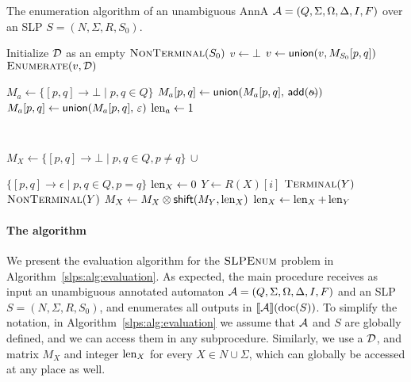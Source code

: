 \begin{algorithm*}[t]
	\caption{The enumeration algorithm of an unambiguous AnnA $\mathcal{A} = (Q,\Sigma, \Omega, \Delta,I,F)$ over an SLP $S = (N, \Sigma, R, S_0)$.}\label{slps:alg:evaluation}
	\smallskip
	\begin{varwidth}[t]{0.50\textwidth}
		\begin{algorithmic}[1]
			\State Initialize $\mathcal{D}$ as an empty \dsabbr
			\State $\textproc{NonTerminal}(S_0)$
			\State $v \gets \bot$
			\State $v \gets \mathsf{union}(v, M_{S_0}[p, q])$
			\EndFor
			\State $\textproc{Enumerate}(v, \cD)$
			
			\EndProcedure
			\smallskip
			
			\State $M_a \gets \{[p,q] \to \bot \mid p,q \in  Q\}$
			\State $M_a[p,q] \gets \union(M_a[p,q],\, \add(\oout))$
			\EndFor
			\State $M_a[p,q] \gets \mathsf{union}(M_a[p,q], \, \varepsilon)$
			\EndFor
			\State $\operatorname{len}_a \gets 1$
			\EndProcedure
		\end{algorithmic}
	\end{varwidth} \ \ \ \ \ 
	\begin{varwidth}[t]{0.50\textwidth}
		\begin{algorithmic}[1]
			\State $M_X \gets \{[p,q] \to \bot \mid p,q \in  Q, p \neq q\} \, \cup$ \par\hspace{2.7em} $\{[p,q] \to \epsilon \mid p,q \in  Q, p = q\}$
			\State $\operatorname{len}_X \gets 0$
			\State $Y \gets R(X)[i]$
			\State $\textproc{Terminal}(Y)$
			\Else
			\State $\textproc{NonTerminal}(Y)$
			\EndIf 
			\EndIf 
			\State $M_X \gets M_X \otimes \mathsf{shift}(M_Y, \operatorname{len}_X)$
			\State $\operatorname{len}_X \gets \operatorname{len}_X + \operatorname{len}_Y$
			\EndFor 
			\EndProcedure
		\end{algorithmic}
	\end{varwidth} 
	\smallskip
\end{algorithm*}

\paragraph{The algorithm} 	
We present the evaluation algorithm for the $\textsc{SLPEnum}$ problem in Algorithm~\ref{slps:alg:evaluation}. As expected, the main procedure  receives as input an unambiguous annotated automaton $\mathcal{A} = (Q,\Sigma, \Omega, \Delta,I,F)$ and an SLP  $S = (N, \Sigma, R, S_0)$, and enumerates all outputs in ${\llbracket{\mathcal{A}}\rrbracket}(\operatorname{doc}(S))$. To simplify the notation, in Algorithm~\ref{slps:alg:evaluation} we assume that $\mathcal{A}$ and $S$ are globally defined, and we can access them in any subprocedure. Similarly, we use a \dsabbr{} $\mathcal{D}$, and matrix $M_X$ and integer $\operatorname{len}_X$ for every $X \in N \cup \Sigma$, which can globally be accessed at any place as well.

